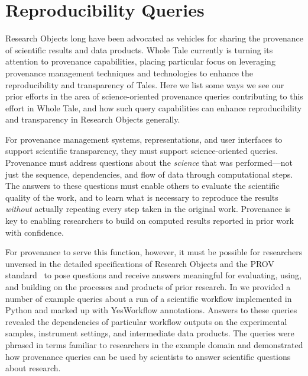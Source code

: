 \section{Reproducibility Queries}\label{sec-transparency}

Research Objects long have been advocated as vehicles for sharing the 
	provenance of scientific results and data products.
Whole Tale currently is turning its attention to provenance capabilities, placing particular
	focus on leveraging provenance management techniques and technologies
	to enhance the reproducibility and transparency of Tales.
Here we list some ways we see our prior efforts in the area
	of science-oriented provenance queries contributing to this effort in Whole Tale,
	and how such query capabilities can enhance reproducibility and transparency in 
	Research Objects generally.

For provenance management systems, representations, and user interfaces to support 
	scientific transparency, they must support science-oriented queries.
Provenance must address questions about the \emph{science} that was performed---not just the
	sequence, dependencies, and flow of data through computational steps.
The answers to these questions must enable others to evaluate the scientific quality of the work, 
	and to learn what is necessary to
	reproduce the results \emph{without} actually repeating every step taken in the original work.
Provenance is key to enabling researchers to build on computed results reported in prior work with confidence.

For provenance to serve this function, however, it must be possible for researchers unversed in the detailed
	specifications of Research Objects and the PROV standard~\cite{groth2013provoverviewa} to pose 
	questions and receive answers meaningful for evaluating, using, and building on the
	processes and products of prior research. 
In \cite{mcphillips2015retrospective} we provided a number of example queries about a run of a scientific
	workflow implemented in Python and marked up with YesWorkflow annotations.
Answers to these queries revealed the dependencies of particular workflow outputs
	on the experimental samples, instrument settings, and intermediate data products.
The queries were phrased in terms familiar to researchers  in the example domain
	and demonstrated how provenance queries can be used by scientists
	to answer scientific questions about research.

